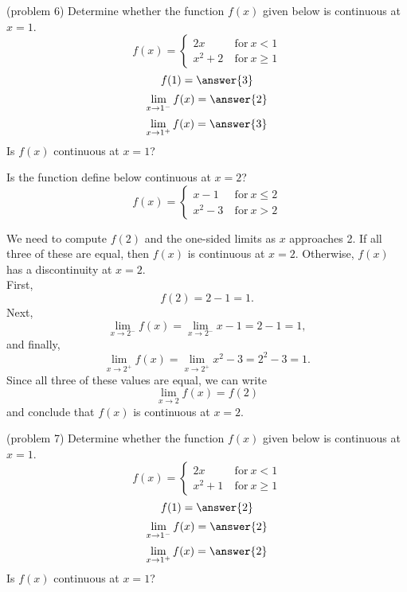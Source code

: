 \documentclass{ximera}
\begin{document}
\begin{problem}(problem 6)
Determine whether the function $f(x)$ given below is continuous at $x = 1$.
\[
f(x) = \left\{
     \begin{array}{lr}
       2x & \ \text{for} \  x < 1 \\
       x^2 + 2 & \ \text{for} \ x \geq 1
     \end{array}
   \right.
\]
\[
f(1) = \answer{3}
\]
\[
\lim_{x \to 1^-} f(x) = \answer{2}
\]
\[
\lim_{x \to 1^+} f(x) = \answer{3}
\]
Is $f(x)$ continuous at $x = 1$?
\begin{multipleChoice}
\end{multipleChoice}
\end{problem}





\begin{example}[example 7]
Is the function define below continuous at $x = 2$?
\[f(x) = \left\{
     \begin{array}{lr}
       x-1 & \ \text{for} \  x \leq 2 \\
       x^2 - 3 & \ \text{for} \ x > 2
     \end{array}
   \right.
\]

We need to  compute $f(2)$ and the one-sided limits as $x$ approaches 2.
If all three of these are equal, then $f(x)$ is continuous at $x=2$.
Otherwise, $f(x)$ has a discontinuity at $x=2$.\\
First, 
\[
f(2) = 2-1 = 1.
\]
Next, 
\[
\lim_{x \to 2^-} f(x) = \lim_{x \to 2^-} x-1 = 2-1 = 1,
\]
and finally,
\[
\lim_{x \to 2^+} f(x) = \lim_{x \to 2^+} x^2 - 3 = 2^2 - 3 = 1.
\]
Since all three of these values are equal, we can write
\[
\lim_{x \to 2} f(x) = f(2)
\]
and conclude that $f(x)$ is continuous at $x = 2$.
\end{example}


\begin{problem}(problem 7)
Determine whether the function $f(x)$ given below is continuous at $x = 1$.
\[
f(x) = \left\{
     \begin{array}{lr}
       2x & \ \text{for} \  x < 1 \\
       x^2 + 1 & \ \text{for} \ x \geq 1
     \end{array}
   \right.
\]
\[
f(1) = \answer{2}
\]
\[
\lim_{x \to 1^-} f(x) = \answer{2}
\]
\[
\lim_{x \to 1^+} f(x) = \answer{2}
\]
Is $f(x)$ continuous at $x = 1$?
\begin{multipleChoice}
\end{multipleChoice}
\end{problem}
\end{document}
